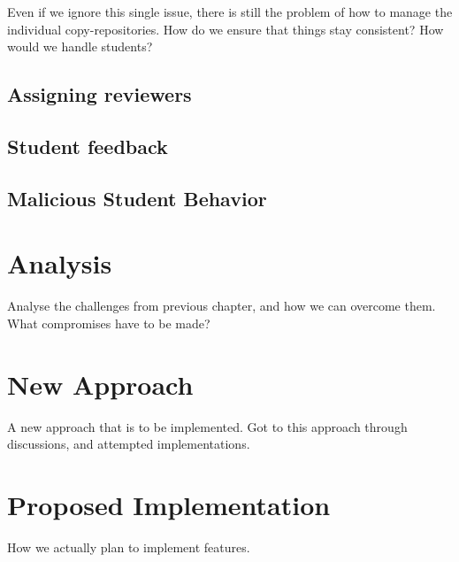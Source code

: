 Even if we ignore this single issue, there is still the problem of how to manage the individual copy-repositories.
How do we ensure that things stay consistent?
How would we handle students?

\subsection{Assigning reviewers}

\subsection{Student feedback}

\subsection{Malicious Student Behavior}

\section{Analysis}

Analyse the challenges from previous chapter, and how we can overcome them.
What compromises have to be made?

\section{New Approach}

A new approach that is to be implemented. Got to this approach through discussions, and attempted implementations.

\section{Proposed Implementation}

How we actually plan to implement features.